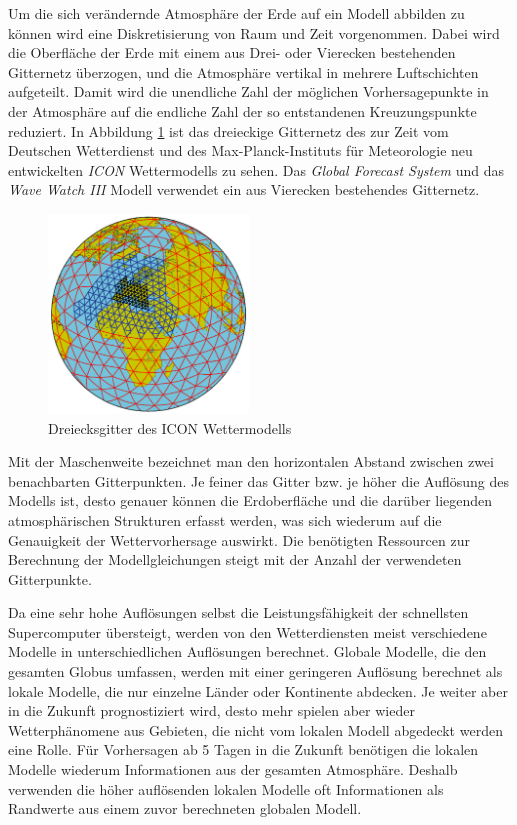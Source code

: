 Um die sich verändernde Atmosphäre der Erde auf ein Modell abbilden zu
können wird eine Diskretisierung von Raum und Zeit vorgenommen. Dabei
wird die Oberfläche der Erde mit einem aus Drei- oder Vierecken
bestehenden Gitternetz überzogen, und die Atmosphäre vertikal in
mehrere Luftschichten aufgeteilt. Damit wird die unendliche Zahl der
möglichen Vorhersagepunkte in der Atmosphäre auf die endliche Zahl der
so entstandenen Kreuzungspunkte reduziert. In Abbildung
\ref{gitternetz} ist das dreieckige Gitternetz des zur Zeit vom
Deutschen Wetterdienst und des Max-Planck-Instituts für Meteorologie
neu entwickelten \textit{ICON}  Wettermodells zu
sehen. Das \textit{Global Forecast System} und das \textit{Wave Watch
  III} Modell verwendet ein aus Vierecken bestehendes Gitternetz.

\begin{figure}[h]
  \begin{center}
    \includegraphics[height=200px]{bilder/gitternetz}
    \caption{Dreiecksgitter des ICON Wettermodells}
    \label{gitternetz}
  \end{center}
\end{figure}

Mit der Maschenweite bezeichnet man den horizontalen Abstand zwischen
zwei benachbarten Gitterpunkten. Je feiner das Gitter bzw. je höher
die Auflösung des Modells ist, desto genauer können die Erdoberfläche
und die darüber liegenden atmosphärischen Strukturen erfasst werden,
was sich wiederum auf die Genauigkeit der Wettervorhersage
auswirkt. Die benötigten Ressourcen zur Berechnung der
Modellgleichungen steigt mit der Anzahl der verwendeten Gitterpunkte.

Da eine sehr hohe Auflösungen selbst die Leistungsfähigkeit der
schnellsten Supercomputer übersteigt, werden von den Wetterdiensten
meist verschiedene Modelle in unterschiedlichen Auflösungen
berechnet. Globale Modelle, die den gesamten Globus umfassen, werden
mit einer geringeren Auflösung berechnet als lokale Modelle, die nur
einzelne Länder oder Kontinente abdecken. Je weiter aber in die
Zukunft prognostiziert wird, desto mehr spielen aber wieder
Wetterphänomene aus Gebieten, die nicht vom lokalen Modell abgedeckt
werden eine Rolle. Für Vorhersagen ab 5 Tagen in die Zukunft benötigen
die lokalen Modelle wiederum Informationen aus der gesamten
Atmosphäre. Deshalb verwenden die höher auflösenden lokalen Modelle
oft Informationen als Randwerte aus einem zuvor berechneten globalen
Modell.

